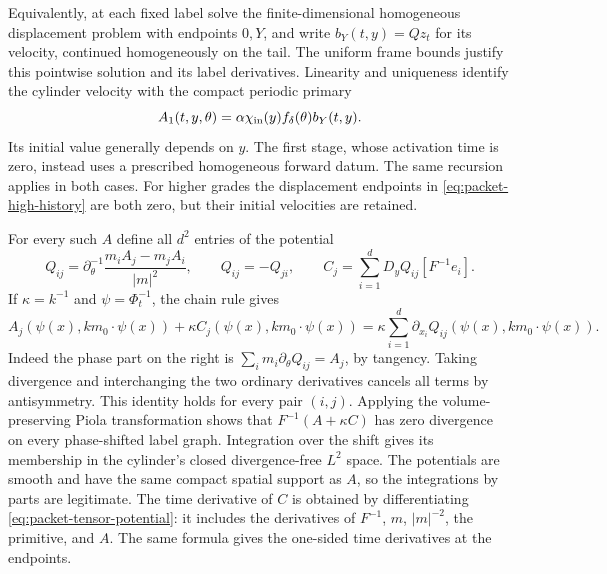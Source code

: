 \documentclass[11pt]{article}
\theoremstyle{definition}
\begin{document}
Equivalently, at each fixed label solve the finite-dimensional homogeneous
displacement problem with endpoints $0,Y$, and write $b_Y(t,y)=Qz_t$
for its velocity, continued homogeneously on the tail. The uniform frame
bounds justify this pointwise solution and its label derivatives. Linearity
and uniqueness identify the cylinder velocity with the compact
periodic primary
\begin{equation}\label{eq:packet-joined-primary}
 A_1(t,y,\theta)=\alpha\chi_{\rm in}(y)f_\delta(\theta)b_Y(t,y).
\end{equation}
Its initial value generally depends on $y$. The first stage,
whose activation time is zero, instead uses a prescribed homogeneous
forward datum. The same recursion applies in both cases. For higher grades
the displacement endpoints in \eqref{eq:packet-high-history} are both
zero, but their initial velocities are retained.

For every such $A$ define all $d^2$ entries of the potential
\begin{equation}\label{eq:packet-tensor-potential}
 Q_{ij}=\partial_\theta^{-1}
       \frac{m_iA_j-m_jA_i}{|m|^2},\qquad Q_{ij}=-Q_{ji},
 \qquad
 C_j=\sum_{i=1}^d D_yQ_{ij}[F^{-1}e_i].
\end{equation}
If $\kappa=k^{-1}$ and $\psi=\Phi_t^{-1}$, the chain rule gives
\begin{equation}\label{eq:packet-pair-curl}
 A_j(\psi(x),km_0\cdot\psi(x))+
 \kappa C_j(\psi(x),km_0\cdot\psi(x))
 =\kappa\sum_{i=1}^d\partial_{x_i}
    Q_{ij}(\psi(x),km_0\cdot\psi(x)).
\end{equation}
Indeed the phase part on the right is
$\sum_i m_i\partial_\theta Q_{ij}=A_j$, by tangency.
Taking divergence and interchanging the two ordinary derivatives cancels
all terms by antisymmetry. This identity holds for every pair $(i,j)$.
Applying the volume-preserving Piola transformation shows that
$F^{-1}(A+\kappa C)$ has zero divergence on every phase-shifted label
graph. Integration over the shift gives its membership in the cylinder's
closed divergence-free $L^2$ space. The potentials are smooth and have
the same compact spatial support as $A$, so the integrations by parts
are legitimate. The time derivative of $C$ is obtained by differentiating
\eqref{eq:packet-tensor-potential}: it includes the derivatives of $F^{-1}$,
$m$, $|m|^{-2}$, the primitive, and $A$. The same formula gives the
one-sided time derivatives at the endpoints.
\end{document}
